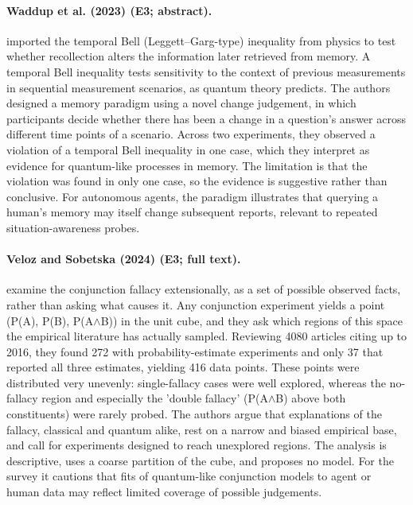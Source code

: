 \documentclass[10pt,a4paper]{article}
\begin{document}
\paragraph{Waddup et al. (2023) (E3; abstract).} \citet{Waddup2023} imported the temporal Bell (Leggett--Garg-type) inequality from physics to test whether recollection alters the information later retrieved from memory. A temporal Bell inequality tests sensitivity to the context of previous measurements in sequential measurement scenarios, as quantum theory predicts. The authors designed a memory paradigm using a novel change judgement, in which participants decide whether there has been a change in a question's answer across different time points of a scenario. Across two experiments, they observed a violation of a temporal Bell inequality in one case, which they interpret as evidence for quantum-like processes in memory. The limitation is that the violation was found in only one case, so the evidence is suggestive rather than conclusive. For autonomous agents, the paradigm illustrates that querying a human's memory may itself change subsequent reports, relevant to repeated situation-awareness probes.

\paragraph{Veloz and Sobetska (2024) (E3; full text).} \citet{Veloz2024} examine the conjunction fallacy extensionally, as a set of possible observed facts, rather than asking what causes it. Any conjunction experiment yields a point (P(A), P(B), P(A$\wedge$B)) in the unit cube, and they ask which regions of this space the empirical literature has actually sampled. Reviewing 4080 articles citing \citep{Tversky1983} up to 2016, they found 272 with probability-estimate experiments and only 37 that reported all three estimates, yielding 416 data points. These points were distributed very unevenly: single-fallacy cases were well explored, whereas the no-fallacy region and especially the 'double fallacy' (P(A$\wedge$B) above both constituents) were rarely probed. The authors argue that explanations of the fallacy, classical and quantum alike, rest on a narrow and biased empirical base, and call for experiments designed to reach unexplored regions. The analysis is descriptive, uses a coarse partition of the cube, and proposes no model. For the survey it cautions that fits of quantum-like conjunction models to agent or human data may reflect limited coverage of possible judgements.
\end{document}
